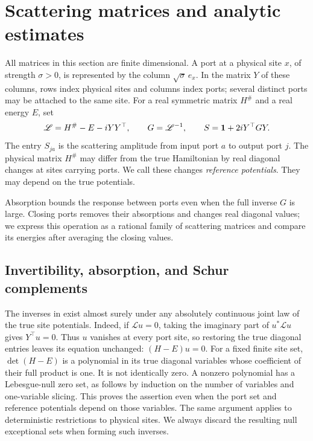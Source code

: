\section{Scattering matrices and analytic estimates}
\label{mat:section}

All matrices in this section are finite dimensional. A port at a physical
site $x$, of strength $\sigma>0$, is represented by the column
$\sqrt{\sigma}\,e_x$. In the matrix $Y$ of these columns, rows index
physical sites and columns index ports; several distinct ports may be
attached to the same site. For a real symmetric matrix
$H^\#$ and a real energy $E$, set
\begin{equation}
  \mathscr L=H^\#-E-iYY^\top,\qquad
  G=\mathscr L^{-1},\qquad
  S=\mathbf 1+2iY^\top GY.
  \label{mat:response}
\end{equation}
The entry $S_{ja}$ is the scattering amplitude from input port $a$ to
output port $j$. The physical matrix $H^\#$ may differ from the true
Hamiltonian by real diagonal changes at sites carrying ports. We call these changes
\emph{reference potentials}. They may depend on the true potentials.

Absorption bounds the response between ports even when the full inverse
$G$ is large. Closing ports removes their absorptions and changes real
diagonal values; we express this operation as a rational family of
scattering matrices and compare its energies after averaging the closing
values.

\subsection{Invertibility, absorption, and Schur complements}

The inverses in  exist almost surely under any
absolutely continuous joint law of the true site potentials. Indeed, if
$\mathscr L u=0$, taking the imaginary part of $u^*\mathscr L u$ gives
$Y^\top u=0$. Thus $u$ vanishes at every port site, so restoring the true
diagonal entries leaves its equation unchanged: $(H-E)u=0$. For a fixed
finite site set, $\det(H-E)$ is a polynomial in its true diagonal
variables whose coefficient of their full product is one. It is not
identically zero. A nonzero polynomial has a Lebesgue-null zero set,
as follows by induction on the number of variables and one-variable
slicing. This proves the assertion even when the port set and reference
potentials depend on those variables. The same argument applies to
deterministic restrictions to physical sites. We always discard the
resulting null exceptional sets when forming such inverses.

